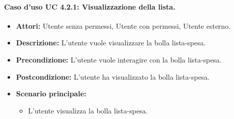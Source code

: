 \paragraph{Caso d'uso UC 4.2.1: Visualizzazione della lista.}
\label{Caso d'uso UC 4.2.1: Visualizzazione della lista.}

\FloatBarrier
\begin{itemize}
\item \textbf{Attori:} Utente senza permessi, Utente con permessi, Utente esterno.
\item \textbf{Descrizione:} L'utente vuole visualizzare la bolla lista-spesa.
\item \textbf{Precondizione:} L'utente vuole interagire con la bolla lista-spesa. 
\item \textbf{Postcondizione:} L'utente ha visualizzato la bolla lista-spesa.
\item \textbf{Scenario principale:}
	\begin{itemize}
	\item{L'utente visualizza la bolla lista-spesa.}
	\end{itemize}
\end{itemize}